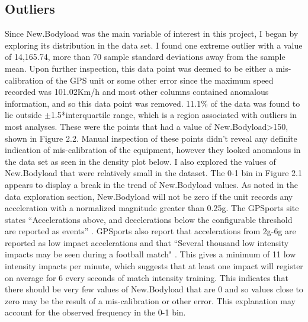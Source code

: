 \subsection{Outliers}
	Since New.Bodyload was the main variable of interest in this project, I began by exploring its distribution in the data set. I found one extreme outlier with a value of 14,165.74, more than 70 sample standard deviations away from the sample mean. Upon further inspection, this data point was deemed to be either a mis-calibration of the GPS unit or some other error since the maximum speed recorded was 101.02Km/h and most other columns contained anomalous information, and so this data point was removed. 11.1\% of the data was found to lie outside $ \pm $1.5*interquartile range, which is a region associated with outliers in most analyses. These were the points that had a value of New.Bodyload\textgreater150, shown in Figure 2.2. Manual inspection of these points didn't reveal any definite indication of mis-calibration of the equipment, however they looked anomalous in the data set as seen in the density plot below.
\hfill\break
\newline
I also explored the values of New.Bodyload that were relatively small in the dataset. The 0-1 bin in Figure 2.1 appears to display a break in the trend of New.Bodyload values. As noted in the data exploration section, New.Bodyload will not be zero if the unit records any acceleration with a normalized magnitude greater than 0.25g. The GPSports  site states ``Accelerations above, and decelerations below the configurable threshold are reported as events'' \cite{GPSportsVariables}. GPSports also report that accelerations from 2g-6g are reported as low impact accelerations and that ``Several thousand low intensity impacts may be seen during a football match" \cite{GPSportsVariables}. This gives a minimum of 11 low intensity impacts per minute, which suggests that at least one impact will register on average for 6 every seconds of match intensity training. This indicates that there should be very few values of New.Bodyload that are 0 and so values close to zero may be the result of a mis-calibration or other error. This explanation may account for the observed frequency in the 0-1 bin.

